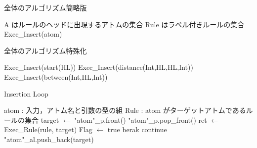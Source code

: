 \begin{algorithm}
    \caption{全体のアルゴリズム簡略版}
\begin{algorithmic}
    \scriptsize
    \Require A はルールのヘッドに出現するアトムの集合
    \Require Rule はラベル付きルールの集合 
                \State Exec\_Insert(atom) 
            \EndFor
        \EndWhile
    \EndProcedure
\end{algorithmic}
\end{algorithm}


\begin{algorithm}
    \caption{全体のアルゴリズム特殊化}
\begin{algorithmic}
    \scriptsize
        \State Exec\_Insert(start(HL))
        \State Exec\_Insert(distance(Int,HL,HL,Int))
            \State Exec\_Insert(between(Int,HL,Int))
        \EndWhile
    \EndProcedure
\end{algorithmic}
\end{algorithm}

\begin{algorithm}
    \caption{Insertion Loop}
\begin{algorithmic}
    \scriptsize
    \Require atom : 入力，アトム名と引数の型の組
    \Require Rule : atom がターゲットアトムであるルールの集合
         
            \State target $\gets$  "atom"\_p.front()
            \State "atom"\_p.pop\_front()
                \State ret $\gets$ Exec\_Rule(rule, target)
                 
                    \State Flag $\gets$ true
                    \State berak
                \EndIf
            \EndFor
                \State continue
            \EndIf
            \State "atom"\_al.push\_back(target)
        \EndWhile
    \EndProcedure
\end{algorithmic}
\end{algorithm}

